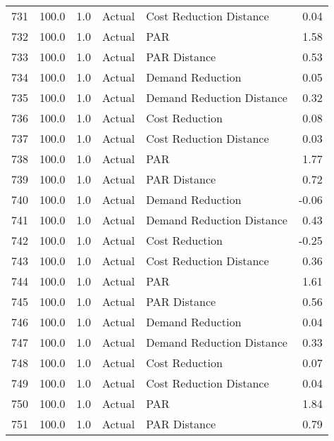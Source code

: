 \begin{longtable}{lrrllr}
731  &        100.0 &     1.0 &         Actual &    Cost Reduction Distance &   0.04 \\
732  &        100.0 &     1.0 &         Actual &                        PAR &   1.58 \\
733  &        100.0 &     1.0 &         Actual &               PAR Distance &   0.53 \\
734  &        100.0 &     1.0 &         Actual &           Demand Reduction &   0.05 \\
735  &        100.0 &     1.0 &         Actual &  Demand Reduction Distance &   0.32 \\
736  &        100.0 &     1.0 &         Actual &             Cost Reduction &   0.08 \\
737  &        100.0 &     1.0 &         Actual &    Cost Reduction Distance &   0.03 \\
738  &        100.0 &     1.0 &         Actual &                        PAR &   1.77 \\
739  &        100.0 &     1.0 &         Actual &               PAR Distance &   0.72 \\
740  &        100.0 &     1.0 &         Actual &           Demand Reduction &  -0.06 \\
741  &        100.0 &     1.0 &         Actual &  Demand Reduction Distance &   0.43 \\
742  &        100.0 &     1.0 &         Actual &             Cost Reduction &  -0.25 \\
743  &        100.0 &     1.0 &         Actual &    Cost Reduction Distance &   0.36 \\
744  &        100.0 &     1.0 &         Actual &                        PAR &   1.61 \\
745  &        100.0 &     1.0 &         Actual &               PAR Distance &   0.56 \\
746  &        100.0 &     1.0 &         Actual &           Demand Reduction &   0.04 \\
747  &        100.0 &     1.0 &         Actual &  Demand Reduction Distance &   0.33 \\
748  &        100.0 &     1.0 &         Actual &             Cost Reduction &   0.07 \\
749  &        100.0 &     1.0 &         Actual &    Cost Reduction Distance &   0.04 \\
750  &        100.0 &     1.0 &         Actual &                        PAR &   1.84 \\
751  &        100.0 &     1.0 &         Actual &               PAR Distance &   0.79 \\

\end{longtable}
